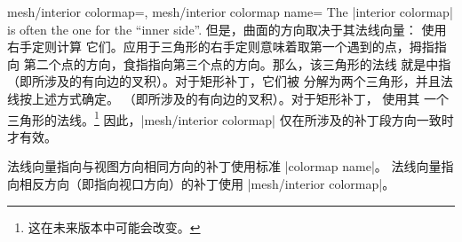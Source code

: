 {{\begin{pgfplotskeylist}{%
    mesh/interior colormap=,%
    mesh/interior colormap name=%
}
    \noindent The |interior colormap| is often the one for the ``inner side''.
    但是，曲面的方向取决于其法线向量：\PGFPlots{} 使用右手定则计算
    它们。应用于三角形的右手定则意味着取第一个遇到的点，拇指指向
    第二个点的方向，食指指向第三个点的方向。那么，该三角形的法线
    就是中指（即所涉及的有向边的叉积）。对于矩形补丁，它们被
    分解为两个三角形，并且法线按上述方式确定。
    （即所涉及的有向边的叉积）。对于矩形补丁，\PGFPlots{} 使用其
    一个三角形的法线。\footnote{这在未来版本中可能会改变。}
    因此，|mesh/interior colormap| 仅在所涉及的补丁段方向一致时
    才有效。

    法线向量指向与视图方向相同方向的补丁使用标准 |colormap name|。
    法线向量指向相反方向（即指向视口方向）的补丁使用
    |mesh/interior colormap|。

\pgfplotsexpensiveexample
\begin{codeexample}[]
\end{codeexample}


\end{pgfplotskeylist}}}

